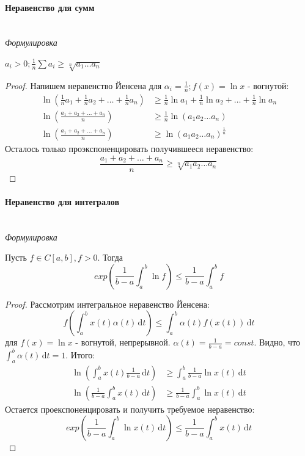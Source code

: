 \documentclass{article}
\def\D{\,\mathrm{d}}
\let\vanillaparagraph\paragraph
\renewcommand{\paragraph}[1]{\vanillaparagraph{#1}\mbox{}\\}
\begin{document}
\paragraph{Неравенство для сумм}
\textit{Формулировка}

$a_i > 0; \frac{1} {n} \sum a_i \geq \sqrt[n]{a_1 \ldots a_n}$
\begin{proof}
Напишем неравенство Йенсена для $\alpha_i = \frac{1} {n}; f(x) = \ln{x}$ - вогнутой:
\begin{align*}
\ln{\left(\frac{1} {n} a_1 + \frac{1} {n} a_2 + \ldots +  \frac{1} {n} a_n\right)} &\geq \frac{1} {n} \ln{a_1} + \frac{1} {n} \ln{a_2} + \ldots + \frac{1} {n} \ln{a_n}\\
\ln{\left(\frac{a_1 + a_2 + \ldots + a_n} {n} \right)} &\geq \frac{1} {n}\ln{(a_1 a_2 \dots a_n)}\\
\ln{\left(\frac{a_1 + a_2 + \ldots + a_n} {n} \right)} &\geq \ln{(a_1 a_2 \dots a_n)}^\frac{1} {n}
\end{align*}
Осталось только проэкспоненцировать получившееся неравенство:
\begin{equation*}
\frac{a_1 + a_2 + \ldots + a_n} {n} \geq \sqrt[n] {a_1 a_2 \dots a_n}
\end{equation*}
\end{proof}

\paragraph{Неравенство для интегралов}
\textit{Формулировка}

Пусть $f \in C[a, b], f > 0$. Тогда 
\begin{equation*}
exp\left(\frac{1} {b - a} \int_a^b \ln{f}\right) \leq \frac{1} {b - a} \int_a^b f
\end{equation*}
\begin{proof}
Рассмотрим интегральное неравенство Йенсена:
\begin{equation*}
f(\int_a^b x(t) \alpha(t) \D t) \le \int_a^b \alpha(t) f(x(t)) \D t
\end{equation*}
для $f(x) = \ln{x}$ - вогнутой, непрерывной. $\alpha(t) = \frac{1} {b - a} = const$. Видно, что $\int_a^b \alpha(t) \D t = 1$. Итого:
\begin{align*}
\ln{\left(\int_a^b x(t) \frac{1} {b - a} \D t\right)} &\geq \int_a^b \frac{1} {b - a} \ln{x(t)} \D t\\
\ln{\left(\frac{1} {b - a} \int_a^b x(t)\D t\right)} &\geq\frac {1}{b - a} \int_a^b \ln{x(t)} \D t
\end{align*}
Остается проекспоненцировать и получить требуемое неравенство:
\begin{equation*}
exp\left(\frac{1} {b - a} \int_a^b \ln{x(t)} \D t\right) \leq \frac{1} {b - a} \int_a^b x(t) \D t
\end{equation*}
\end{proof}
\end{document}
